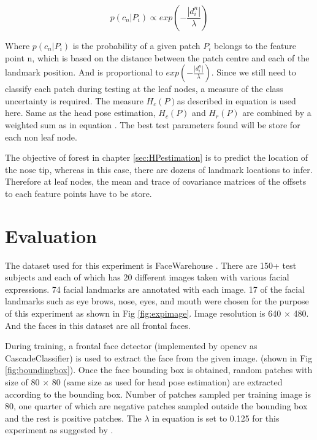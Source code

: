 \begin{equation}
\label{eq:classaffiliation}
p(c_{n}|P_i) \propto exp(- \frac{|d_{i}^{n}|}{\lambda})
\end{equation}

Where $p(c_{n}|P_i)$ is the probability of a given patch ${P_i}$ belongs to the feature point n, which is based on the distance between the patch centre and each of the landmark position. \cite{2dGFRF} And is proportional to $exp(- \frac{|d_{i}^{n}|}{\lambda})$.  Since we still need to classify each patch during testing at the leaf nodes, a measure of the class uncertainty is required. The measure $H_{c}(P)$as described in equation  is used here. Same as the head pose estimation, $H_{c}(P)$ and $H_{r}(P)$ are combined by a weighted sum as in equation . The best test parameters found will be store for each non leaf node.

The objective of forest in chapter \ref{sec:HPestimation} is to predict the location of the nose tip, whereas in this case, there are dozens of landmark locations to infer. Therefore at leaf nodes, the mean and trace of covariance matrices of the offsets to each feature points have to be store.

\newpage
\thispagestyle{plain}
\mbox{}

\section{Evaluation}
\label{sec:FFeval}
The dataset used for this experiment is FaceWarehouse \cite{facewarehouse}. There are 150+ test subjects and each of which has 20 different images taken with various facial expressions. 74 facial landmarks are annotated with each image. 17 of the facial landmarks such as eye brows, nose, eyes, and mouth were chosen for the purpose of this experiment as shown in Fig \ref{fig:expimage}. Image resolution is 640 $\times$ 480. And the faces in this dataset are all frontal faces.

During training, a frontal face detector \cite{facedetect}(implemented by opencv as CascadeClassifier) is used to extract the face from the given image. (shown in Fig \ref{fig:boundingbox}). Once the face bounding box is obtained, random patches with size of 80 $\times$ 80 (same size as used for head pose estimation) are extracted according to the bounding box. Number of patches sampled per training image is 80, one quarter of which are negative patches sampled outside the bounding box and the rest is positive patches. The $\lambda$ in equation  is set to 0.125 for this experiment as suggested by \cite{2dGFRF}. 

